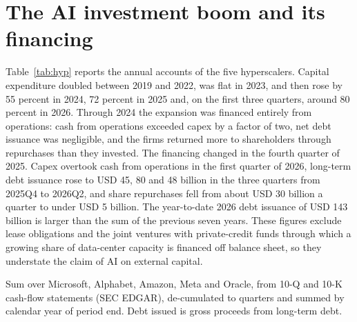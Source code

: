 \documentclass[AER]{AEA}
\begin{document}
\section{The AI investment boom and its financing}\label{sec:boom}

Table~\ref{tab:hyp} reports the annual accounts of the five hyperscalers. Capital expenditure doubled between 2019 and 2022, was flat in 2023, and then rose by 55 percent in 2024, 72 percent in 2025 and, on the first three quarters, around 80 percent in 2026. Through 2024 the expansion was financed entirely from operations: cash from operations exceeded capex by a factor of two, net debt issuance was negligible, and the firms returned more to shareholders through repurchases than they invested. The financing changed in the fourth quarter of 2025. Capex overtook cash from operations in the first quarter of 2026, long-term debt issuance rose to USD 45, 80 and 48 billion in the three quarters from 2025Q4 to 2026Q2, and share repurchases fell from about USD 30 billion a quarter to under USD 5 billion. The year-to-date 2026 debt issuance of USD 143 billion is larger than the sum of the previous seven years. These figures exclude lease obligations and the joint ventures with private-credit funds through which a growing share of data-center capacity is financed off balance sheet, so they understate the claim of AI on external capital.

\begin{table}
\caption{Hyperscaler capital expenditure and its financing, USD billion}\label{tab:hyp}
\begin{tablenotes}
Sum over Microsoft, Alphabet, Amazon, Meta and Oracle, from 10-Q and 10-K cash-flow statements (SEC EDGAR), de-cumulated to quarters and summed by calendar year of period end. Debt issued is gross proceeds from long-term debt.
\end{tablenotes}
\end{table}
\end{document}
